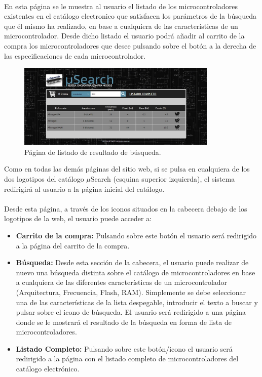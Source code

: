\paragraph{}En esta página se le muestra al usuario el listado de los microcontroladores existentes en el catálogo electronico que satisfacen los parámetros de la búsqueda que él mismo ha realizado, en base a cualquiera de las características de un microcontrolador. Desde dicho listado el usuario podrá añadir al carrito de la compra los microcontroladores que desee pulsando sobre el botón a la derecha de las especificaciones de cada microcontrolador.

\begin{figure}[h!]
	\centering
	\includegraphics[width=0.85\textwidth]{img/listado_busqueda_user}
	\caption{Página de listado de resultado de búsqueda.}
	\label{fig:listado_busqueda_user}
\end{figure}

Como en todas las demás páginas del sitio web, si se pulsa en cualquiera de los dos logotipos del catálogo $\mu$Search (esquina superior izquierda), el sistema redirigirá al usuario a la página inicial del catálogo.

\paragraph{}Desde esta página, a través de los iconos situados en la cabecera debajo de los logotipos de la web, el usuario puede acceder a:

\begin{itemize}
	\item\textbf{Carrito de la compra:} Pulsando sobre este botón el usuario será redirigido a la página del carrito de la compra.
	
	\item \textbf{Búsqueda:} Desde esta sección de la cabecera, el usuario puede realizar de nuevo una búsqueda distinta sobre el catálogo de microcontroladores en base a cualquiera de las diferentes características de un microcontrolador (Arquitectura, Frecuencia, Flash, RAM). Simplemente se debe seleccionar una de las características de la lista despegable, introducir el texto a buscar y pulsar sobre el icono de búsqueda.
	El usuario será redirigido a una página donde se le mostrará el resultado de la búsqueda en forma de lista de microcontroladores.
		
	\item \textbf{Listado Completo:} Pulsando sobre este botón/icono el usuario será redirigido a la página con el listado completo de microcontroladores del catálogo electrónico.
\end{itemize}